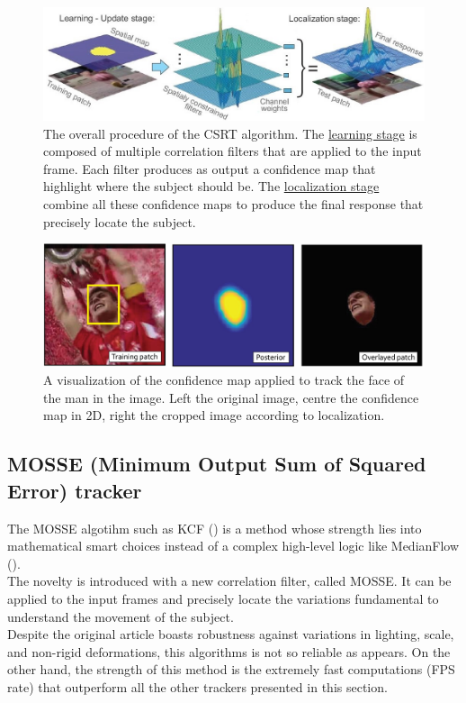 \begin{figure}[!h]
	\centering
	\includegraphics[width=1\linewidth]{images/tracking/howItWorks_CSRT}
	\caption{The overall procedure of the CSRT algorithm. The \underline{learning stage} is composed of multiple correlation filters that are applied to the input frame. Each filter produces as output a confidence map that highlight where the subject should be. The \underline{localization stage} combine all these confidence maps to produce the final response that precisely locate the subject.}
	\label{fig:howItWorks_CSRT}
\end{figure}
\begin{figure}[!h]
	\centering
	\includegraphics[width=0.8\linewidth]{images/tracking/sample_CSRT}
	\caption{A visualization of the confidence map applied to track the face of the man in the image. Left the original image, centre the confidence map in 2D, right the cropped image according to localization.}
	\label{fig:sample_CSRT}
\end{figure}


\subsection{MOSSE (Minimum Output Sum of Squared Error) tracker}
The MOSSE algotihm\cite{mosse} such as KCF () is a method whose strength lies into mathematical smart choices instead of a complex high-level logic like MedianFlow ().\\
The novelty is introduced with a new correlation filter, called MOSSE. It can be applied to the input frames and precisely locate the variations fundamental to understand the movement of the subject.\\
Despite the original article boasts robustness against variations in lighting, scale, and non-rigid deformations, this algorithms is not so reliable as appears. On the other hand, the strength of this method is the extremely fast computations (FPS rate) that outperform all the other trackers presented in this section.

